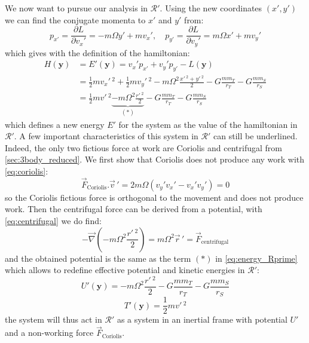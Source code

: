 We now want to pursue our analysis in $\mathcal{R}'$. Using the new coordinates $(x',y')$ we can find the conjugate momenta to $x'$ and $y'$ from:
\begin{equation}
    p_{x'} = \frac{\partial L}{\partial v_x'} = -m\Omega y' + mv_x', \quad p_{y'} = \frac{\partial L}{\partial v_y'} = m\Omega x' + mv_y'
\end{equation}
which gives with the definition of the hamiltonian:
\begin{equation}
    \begin{aligned}
        H(\mathbf{y}) & = E'(\mathbf{y}) = v_x'p_{x'} + v_y'p_{y'} - L(\mathbf{y}) \\
        & = \frac{1}{2}mv_x'\,^2 + \frac{1}{2}mv_y'\,^2 - m\Omega^2\frac{x'\,^2 + y'\,^2}{2} - G \frac{mm_T}{r_T} - G \frac{mm_S}{r_S} \\
        & = \frac{1}{2}mv'\,^2 \underbrace{- m\Omega^2\frac{r'\,^2}{2}}_{(\ast)} - G \frac{mm_T}{r_T} - G \frac{mm_S}{r_S}
        \label{eq:energy_Rprime}
    \end{aligned}
\end{equation}
which defines a new energy $E'$ for the system as the value of the hamiltonian in $\mathcal{R}'$. A few important characteristics of this system in $\mathcal{R}'$ can still be underlined. Indeed, the only two fictious force at work are Coriolis and centrifugal from \autoref{sec:3body_reduced}. We first show that Coriolis does not produce any work with \autoref{eq:coriolis}:
\begin{equation}
    \vec{F}_\mathrm{Coriolis}.\vec{v}\,' = 2m\Omega(v_y'v_x' - v_x'v_y') = 0
\end{equation}
so the Coriolis fictious force is orthogonal to the movement and does not produce work. Then the centrifugal force can be derived from a potential, with \autoref{eq:centrifugal} we do find:
\begin{equation}
    - \vec{\nabla} (-m\Omega^2 \frac{r'\,^2}{2}) = m \Omega^2 \vec{r}\,' = \vec{F}_\mathrm{centrifugal}
\end{equation}
and the obtained potential is the same as the term $(\ast)$ in \autoref{eq:energy_Rprime} which allows to redefine effective potential and kinetic energies in $\mathcal{R}'$:
\begin{equation}
    U'(\mathbf{y}) = - m\Omega^2\frac{r'\,^2}{2} - G \frac{mm_T}{r_T} - G \frac{mm_S}{r_S}
\end{equation}
\begin{equation}
    T'(\mathbf{y}) = \frac{1}{2}mv'\,^2
\end{equation}
the system will thus act in $\mathcal{R}'$ as a system in an inertial frame with potential $U'$ and a non-working force $\vec{F}_\mathrm{Coriolis}$.


